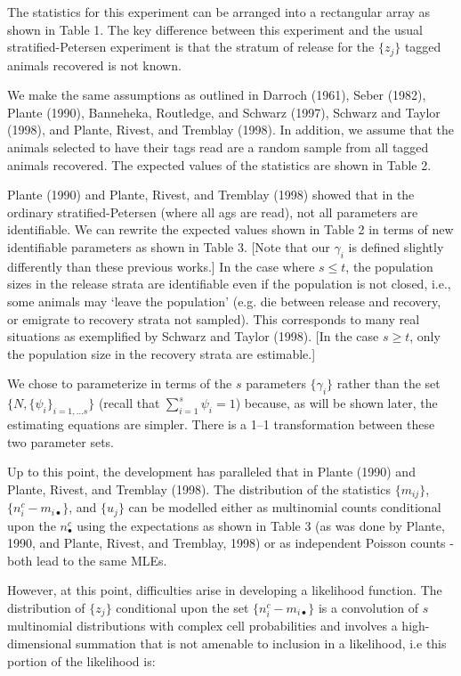   


The statistics for this experiment can be arranged into a rectangular
array as shown in Table 1.
The key difference between this experiment 
and the usual stratified-Petersen experiment
is that 
the stratum of release for the 
$\{z_j\}$
tagged animals recovered is not known.

We make the same assumptions as outlined in Darroch (1961),
Seber (1982), Plante (1990),
Banneheka, Routledge, and Schwarz (1997), Schwarz and Taylor (1998), and
Plante, Rivest, and Tremblay (1998). 
In addition, we assume that the animals selected to have their tags read
are a random sample from all tagged animals recovered. 
The expected values of the statistics are shown in Table 2.

Plante (1990) and Plante, Rivest, and Tremblay (1998)
 showed that in the ordinary stratified-Petersen (where all
ags are read), not all parameters are identifiable.
We can rewrite the expected values
shown in Table 2 in terms of new identifiable parameters as shown in Table 3.
[Note that our $\gamma _i$ is defined slightly differently than
these previous works.]
In the case where $s\le t$, 
the population sizes in the release strata are identifiable
even if the population is not closed, i.e., some animals may `leave
the population' (e.g. die between release and recovery, or emigrate to
recovery strata not sampled).
This corresponds to many real situations as exemplified by
Schwarz and Taylor (1998). 
[In the case  $s\ge t$, only the population size in the recovery
strata are estimable.]

We chose to parameterize in terms of the $s$ parameters
$\{\gamma _i\}$ 
rather than the set 
$\{ N,\{\psi _i\}_{i=1,\ldots s}\}$
(recall that $\sum\limits_{i=1}^s {\psi _i}=1$) because, as will
be shown later, the estimating equations are simpler.
There is a 1--1 transformation between these two parameter sets.

Up to this point, the development has paralleled that in Plante (1990)
and Plante, Rivest, and Tremblay (1998). 
The distribution of the statistics 
$\{ m_{ij} \}$,
$\{ {n_i^c - m_{i \bullet }} \}$,
and
$\{ {u_j} \}$ 
can be modelled either as 
multinomial counts conditional upon the $n_\bullet ^c$
using the  expectations
as shown in Table 3 (as was done by Plante, 1990, and Plante, Rivest, and Tremblay,  1998)
or as independent Poisson counts - both lead to the same MLEs.

However, at this point, difficulties arise in
developing a likelihood function. 
The distribution of 
$\{ {z_j} \}$ 
conditional upon the set 
$\{ {{n_i^c - m_{i \bullet }}} \}$
is a convolution of $s$ multinomial
distributions with complex  cell probabilities and 
involves a high-dimensional summation that is not amenable
to inclusion in a likelihood, i.e this portion of the likelihood is:

